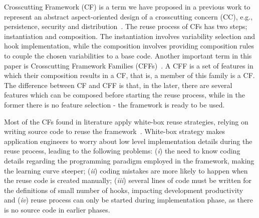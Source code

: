
Crosscutting Framework (CF) is a term we have proposed in a previous work to represent an abstract aspect-oriented design of a crosscutting concern (CC), e.g., persistence, security and distribution~\citep{camanais}. %
The reuse process of CFs has two steps; instantiation and composition. The instantiation involves variability selection and hook implementation, while the composition involves providing composition rules to couple the chosen variabilities to a base code. 
%
Another important term in this paper is Crosscutting Framework Families (CFFs)~\cite{valterCFF}. A CFF is a set of features in which their composition results in a CF, that is, a member of this family is a CF. %
The difference between CF and CFF is that, in the later, there are several features which can be composed before starting the reuse process, while in the former there is no feature selection - the framework is ready to be used.




Most of the CFs found in literature apply white-box reuse strategies, %
 relying on writing source code to reuse the framework~\citep{Kulesza06improvingextensibility,
camanais,bynens,sakenou,cunha}. 
White-box strategy makes application engineers to worry about low level implementation details during the reuse process, leading to the following problems: (\textit{i}) the need to know coding details regarding the programming paradigm employed in the framework, making the learning curve steeper; (\textit{ii}) coding mistakes are more likely to happen when the reuse code is created manually; (\textit{iii}) several lines of code must be written for the definitions of small number of hooks, impacting development productivity and (\textit{iv}) reuse process can only be started during implementation phase, as there is no source code in earlier phases.

